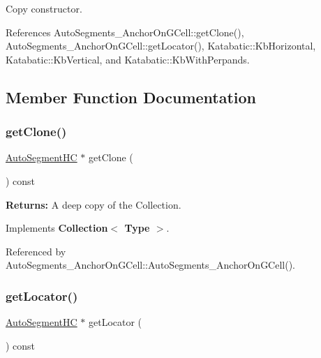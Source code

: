 Copy constructor. 

References Auto\+Segments\+\_\+\+Anchor\+On\+G\+Cell\+::get\+Clone(), Auto\+Segments\+\_\+\+Anchor\+On\+G\+Cell\+::get\+Locator(), Katabatic\+::\+Kb\+Horizontal, Katabatic\+::\+Kb\+Vertical, and Katabatic\+::\+Kb\+With\+Perpands.



\subsection{Member Function Documentation}
\mbox{\label{classKatabatic_1_1AutoSegments__AnchorOnGCell_a5b26b0698bdcb40cbf51b250dfb21858}} 
\subsubsection{\texorpdfstring{get\+Clone()}{getClone()}}
{\footnotesize\ttfamily \hyperlink{namespaceKatabatic_acb3628dc7705fefe38a665cfe43efa6e}{Auto\+Segment\+HC} $\ast$ get\+Clone (\begin{DoxyParamCaption}{ }\end{DoxyParamCaption}) const\hspace{0.3cm}{\ttfamily [virtual]}}

{\bfseries Returns\+:} A deep copy of the Collection. 

Implements \textbf{ Collection$<$ Type $>$}.



Referenced by Auto\+Segments\+\_\+\+Anchor\+On\+G\+Cell\+::\+Auto\+Segments\+\_\+\+Anchor\+On\+G\+Cell().

\mbox{\label{classKatabatic_1_1AutoSegments__AnchorOnGCell_a07665c070fcc269aec02ce842f384483}} 
\subsubsection{\texorpdfstring{get\+Locator()}{getLocator()}}
{\footnotesize\ttfamily \hyperlink{namespaceKatabatic_acb3628dc7705fefe38a665cfe43efa6e}{Auto\+Segment\+HC} $\ast$ get\+Locator (\begin{DoxyParamCaption}{ }\end{DoxyParamCaption}) const\hspace{0.3cm}{\ttfamily [virtual]}}

